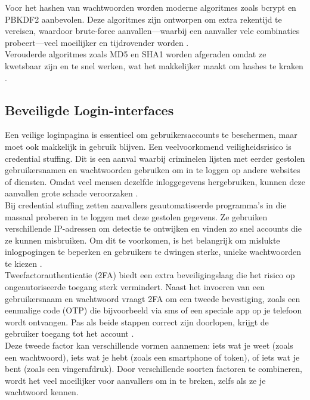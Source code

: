 Voor het hashen van wachtwoorden worden moderne algoritmes zoals bcrypt en PBKDF2 aanbevolen. Deze algoritmes zijn ontworpen om extra rekentijd te vereisen, waardoor brute-force aanvallen—waarbij een aanvaller vele combinaties probeert—veel moeilijker en tijdrovender worden \autocite{Gupta2022}.\\

Verouderde algoritmes zoals MD5 en SHA1 worden afgeraden omdat ze kwetsbaar zijn en te snel werken, wat het makkelijker maakt om hashes te kraken \autocite{ReesCarter2024}.

\subsection{Beveiligde Login-interfaces}
Een veilige loginpagina is essentieel om gebruikersaccounts te beschermen, maar moet ook makkelijk in gebruik blijven. Een veelvoorkomend veiligheidsrisico is credential stuffing. Dit is een aanval waarbij criminelen lijsten met eerder gestolen gebruikersnamen en wachtwoorden gebruiken om in te loggen op andere websites of diensten. Omdat veel mensen dezelfde inloggegevens hergebruiken, kunnen deze aanvallen grote schade veroorzaken \autocite{Chinnasamy2025}.\\

Bij credential stuffing zetten aanvallers geautomatiseerde programma’s in die massaal proberen in te loggen met deze gestolen gegevens. Ze gebruiken verschillende IP-adressen om detectie te ontwijken en vinden zo snel accounts die ze kunnen misbruiken. Om dit te voorkomen, is het belangrijk om mislukte inlogpogingen te beperken en gebruikers te dwingen sterke, unieke wachtwoorden te kiezen \autocite{Chinnasamy2025}.\\

Tweefactorauthenticatie (2FA) biedt een extra beveiligingslaag die het risico op ongeautoriseerde toegang sterk vermindert. Naast het invoeren van een gebruikersnaam en wachtwoord vraagt 2FA om een tweede bevestiging, zoals een eenmalige code (OTP) die bijvoorbeeld via sms of een speciale app op je telefoon wordt ontvangen. Pas als beide stappen correct zijn doorlopen, krijgt de gebruiker toegang tot het account \autocite{Jurisons2024}.\\

Deze tweede factor kan verschillende vormen aannemen: iets wat je weet (zoals een wachtwoord), iets wat je hebt (zoals een smartphone of token), of iets wat je bent (zoals een vingerafdruk). Door verschillende soorten factoren te combineren, wordt het veel moeilijker voor aanvallers om in te breken, zelfs als ze je wachtwoord kennen.\\

